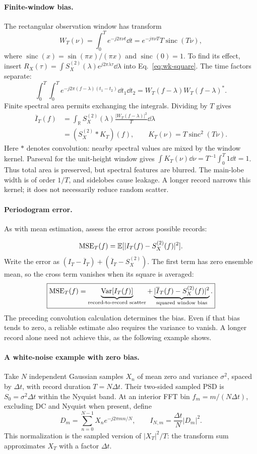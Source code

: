 \paragraph{Finite-window bias.}
The rectangular observation window has transform
\[
W_T(\nu)=\int_0^T e^{-j2\pi\nu t}\dd t
=e^{-j\pi\nu T}T\operatorname{sinc}(T\nu),
\]
where $\operatorname{sinc}(x)=\sin(\pi x)/(\pi x)$ and $\operatorname{sinc}(0)=1$. To find its effect, insert
$R_X(\tau)=\int S_X^{(2)}(\lambda)e^{j2\pi\lambda\tau}\dd\lambda$
into Eq.~\eqref{eq:wk-square}. The time factors separate:
\[
\int_0^T\!\int_0^T e^{-j2\pi(f-\lambda)(t_1-t_2)}\dd t_1\dd t_2
=W_T(f-\lambda)W_T(f-\lambda)^*.
\]
Finite spectral area permits exchanging the integrals. Dividing by $T$ gives
\begin{align*}
\overline I_T(f)
&=\int_{\mathbb R}S_X^{(2)}(\lambda)
\frac{|W_T(f-\lambda)|^2}{T}\dd\lambda\\
&=(S_X^{(2)}*K_T)(f),\qquad K_T(\nu)=T\operatorname{sinc}^2(T\nu).
\end{align*}
Here $*$ denotes convolution: nearby spectral values are mixed by the window kernel. Parseval for the unit-height window gives $\int K_T(\nu)\dd\nu=T^{-1}\int_0^T1\dd t=1$. Thus total area is preserved, but spectral features are blurred. The main-lobe width is of order $1/T$, and sidelobes cause leakage. A longer record narrows this kernel; it does not necessarily reduce random scatter.

\paragraph{Periodogram error.}
As with mean estimation, assess the error across possible records:

\[
\operatorname{MSE}_T(f)
=\mathbb E[|I_T(f)-S_X^{(2)}(f)|^2].
\]
Write the error as $(I_T-\overline I_T)+(\overline I_T-S_X^{(2)})$. The first term has zero ensemble mean, so the cross term vanishes when its square is averaged:
\[
\boxed{\operatorname{MSE}_T(f)
=\underbrace{\operatorname{Var}[I_T(f)]}_{\text{record-to-record scatter}}
+\underbrace{|\overline I_T(f)-S_X^{(2)}(f)|^2}_{\text{squared window bias}}.}
\]
The preceding convolution calculation determines the bias. Even if that bias tends to zero, a reliable estimate also requires the variance to vanish. A longer record alone need not achieve this, as the following example shows.

\paragraph{A white-noise example with zero bias.}
Take $N$ independent Gaussian samples $X_n$ of mean zero and variance $\sigma^2$, spaced by $\Delta t$, with record duration $T=N\Delta t$. Their two-sided sampled PSD is
$S_0=\sigma^2\Delta t$ within the Nyquist band. At an interior FFT bin $f_m=m/(N\Delta t)$, excluding DC and Nyquist when present, define
\[
D_m=\sum_{n=0}^{N-1}X_ne^{-j2\pi mn/N},\qquad
I_{N,m}=\frac{\Delta t}{N}|D_m|^2.
\]
This normalization is the sampled version of $|X_T|^2/T$: the transform sum approximates $X_T$ with a factor $\Delta t$.

